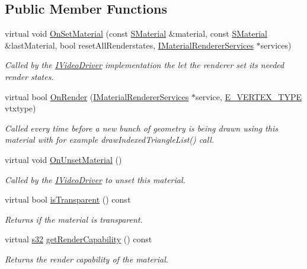 \subsection*{Public Member Functions}
\begin{DoxyCompactItemize}
\item 
virtual void \hyperlink{classirr_1_1video_1_1IMaterialRenderer_aeaffc03c1b9feb40cd01469726b287e3}{On\+Set\+Material} (const \hyperlink{classirr_1_1video_1_1SMaterial}{S\+Material} \&material, const \hyperlink{classirr_1_1video_1_1SMaterial}{S\+Material} \&last\+Material, bool reset\+All\+Renderstates, \hyperlink{classirr_1_1video_1_1IMaterialRendererServices}{I\+Material\+Renderer\+Services} $\ast$services)
\begin{DoxyCompactList}\small\item\em Called by the \hyperlink{classirr_1_1video_1_1IVideoDriver}{I\+Video\+Driver} implementation the let the renderer set its needed render states. \end{DoxyCompactList}\item 
virtual bool \hyperlink{classirr_1_1video_1_1IMaterialRenderer_a8cb6c5f93856de7586a318f14ed21a22}{On\+Render} (\hyperlink{classirr_1_1video_1_1IMaterialRendererServices}{I\+Material\+Renderer\+Services} $\ast$service, \hyperlink{namespaceirr_1_1video_a0e3b59e025e0d0db0ed2ee0ce904deac}{E\+\_\+\+V\+E\+R\+T\+E\+X\+\_\+\+T\+Y\+PE} vtxtype)
\begin{DoxyCompactList}\small\item\em Called every time before a new bunch of geometry is being drawn using this material with for example draw\+Indexed\+Triangle\+List() call. \end{DoxyCompactList}\item 
virtual void \hyperlink{classirr_1_1video_1_1IMaterialRenderer_a694b1285671853cb151c03100fd01c73}{On\+Unset\+Material} ()
\begin{DoxyCompactList}\small\item\em Called by the \hyperlink{classirr_1_1video_1_1IVideoDriver}{I\+Video\+Driver} to unset this material. \end{DoxyCompactList}\item 
virtual bool \hyperlink{classirr_1_1video_1_1IMaterialRenderer_ac472a5832eed8d848240c82278e56312}{is\+Transparent} () const
\begin{DoxyCompactList}\small\item\em Returns if the material is transparent. \end{DoxyCompactList}\item 
virtual \hyperlink{namespaceirr_ac66849b7a6ed16e30ebede579f9b47c6}{s32} \hyperlink{classirr_1_1video_1_1IMaterialRenderer_a5ca13576cb3f466cf2cd9427926121fa}{get\+Render\+Capability} () const
\begin{DoxyCompactList}\small\item\em Returns the render capability of the material. \end{DoxyCompactList}\end{DoxyCompactItemize}
